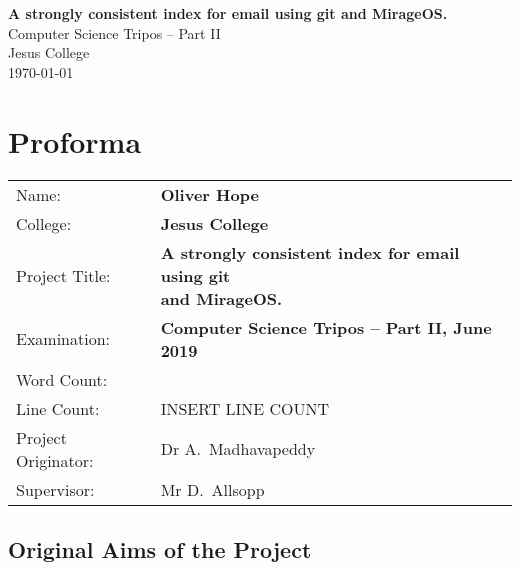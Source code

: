 \documentclass[12pt,a4paper,twoside,openright]{report}
\begin{document}

\pagestyle{empty}


\vspace*{60mm}
\begin{center}
\Huge
\textbf{A strongly consistent index for email using git and MirageOS.} \\[5mm]
Computer Science Tripos -- Part II \\[5mm]
Jesus College \\[5mm]
\today  %
\end{center}


\pagestyle{plain}

\chapter*{Proforma}

\begin{adjustbox}{width={\textwidth},totalheight={\textheight},keepaspectratio}%
{\large
\begin{tabular}{ll}
Name:               & \bf Oliver Hope \\
College:            & \bf Jesus College \\
Project Title:      & \makecell[l]{\bf A strongly consistent index for email using git \\ \bf and MirageOS.} \\
Examination:        & \bf Computer Science Tripos -- Part II, June 2019 \\
Word Count:         & \bf \footnotemark[1] \\
Line Count:         & INSERT LINE COUNT \\
Project Originator: & Dr A.~Madhavapeddy \\
Supervisor:         & Mr D.~Allsopp \\
\end{tabular}
}
\end{adjustbox}


\section*{Original Aims of the Project}
\end{document}
